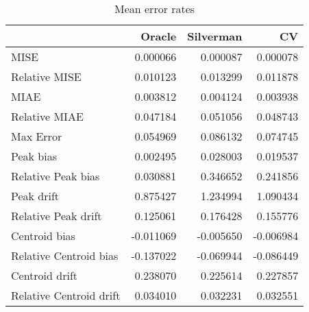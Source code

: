 \begin{table}[H]
\centering
\begin{tabular}{lrrr}
  \hline
 & Oracle & Silverman & CV \\ 
  \hline
MISE & 0.000066 & 0.000087 & 0.000078 \\ 
  Relative MISE & 0.010123 & 0.013299 & 0.011878 \\ 
  MIAE & 0.003812 & 0.004124 & 0.003938 \\ 
  Relative MIAE & 0.047184 & 0.051056 & 0.048743 \\ 
  Max Error & 0.054969 & 0.086132 & 0.074745 \\ 
  Peak bias & 0.002495 & 0.028003 & 0.019537 \\ 
  Relative Peak bias & 0.030881 & 0.346652 & 0.241856 \\ 
  Peak drift & 0.875427 & 1.234994 & 1.090434 \\ 
  Relative Peak drift & 0.125061 & 0.176428 & 0.155776 \\ 
  Centroid bias & -0.011069 & -0.005650 & -0.006984 \\ 
  Relative Centroid bias & -0.137022 & -0.069944 & -0.086449 \\ 
  Centroid drift & 0.238070 & 0.225614 & 0.227857 \\ 
  Relative Centroid drift & 0.034010 & 0.032231 & 0.032551 \\ 
   \hline
\end{tabular}
\caption{Mean error rates} 
\label{tbl:mean_error_rates}
\end{table}
